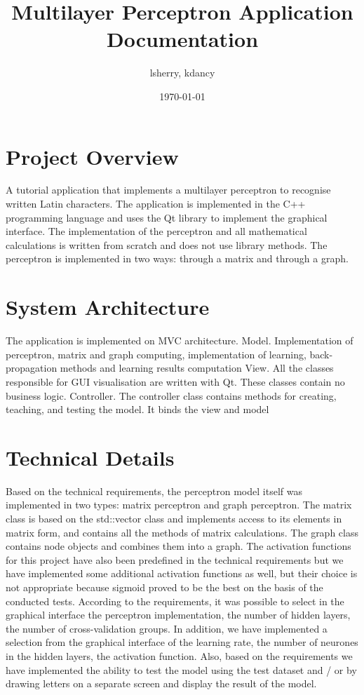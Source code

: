 \documentclass{article}
\title{Multilayer Perceptron Application Documentation}
\author{lsherry, kdancy}
\date{\today}
\begin{document}
\maketitle

\section{Project Overview}
A tutorial application that implements a multilayer perceptron to recognise written Latin characters. The application is implemented in the C++ programming language and uses the Qt library to implement the graphical interface. The implementation of the perceptron and all mathematical calculations is written from scratch and does not use library methods. The perceptron is implemented in two ways: through a matrix and through a graph. 

\section{System Architecture}
The application is implemented on MVC architecture.
Model. Implementation of perceptron, matrix and graph computing, implementation of learning, back-propagation methods and learning results computation
View. All the classes responsible for GUI visualisation are written with Qt. These classes contain no business logic. 
Controller. The controller class contains methods for creating, teaching, and testing the model. It binds the view and model

\section{Technical Details}
Based on the technical requirements, the perceptron model itself was implemented in two types: matrix perceptron and graph perceptron. The matrix class is based on the std::vector class and implements access to its elements in matrix form, and contains all the methods of matrix calculations. The graph class contains node objects and combines them into a graph.
The activation functions for this project have also been predefined in the technical requirements but we have implemented some additional activation functions as well, but their choice is not appropriate because sigmoid proved to be the best on the basis of the conducted tests.
According to the requirements, it was possible to select in the graphical interface the perceptron implementation, the number of hidden layers, the number of cross-validation groups. In addition, we have implemented a selection from the graphical interface of the learning rate, the number of neurones in the hidden layers, the activation function.
Also, based on the requirements we have implemented the ability to test the model using the test dataset and / or by drawing letters on a separate screen and display the result of the model.
\end{document}

